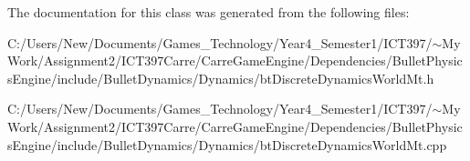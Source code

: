 The documentation for this class was generated from the following files:\begin{CompactItemize}
\item 
C:/Users/New/Documents/Games\_\-Technology/Year4\_\-Semester1/ICT397/$\sim$My Work/Assignment2/ICT397Carre/CarreGameEngine/Dependencies/BulletPhysicsEngine/include/BulletDynamics/Dynamics/btDiscreteDynamicsWorldMt.h\item 
C:/Users/New/Documents/Games\_\-Technology/Year4\_\-Semester1/ICT397/$\sim$My Work/Assignment2/ICT397Carre/CarreGameEngine/Dependencies/BulletPhysicsEngine/include/BulletDynamics/Dynamics/btDiscreteDynamicsWorldMt.cpp\end{CompactItemize}
